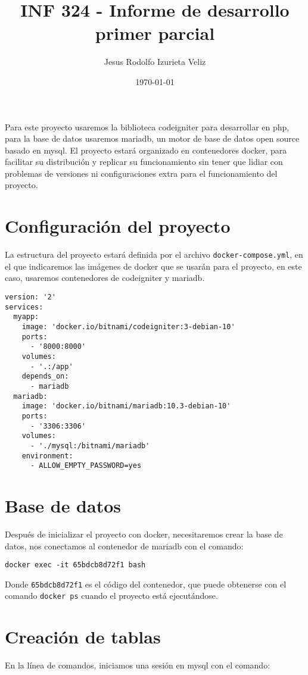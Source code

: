 \documentclass[letter]{article}
\author{Jesus Rodolfo Izurieta Veliz}
\date{\today}
\title{INF 324 - Informe de desarrollo primer parcial}
\begin{document}
\maketitle
Para este proyecto usaremos la biblioteca codeigniter para desarrollar en php,
para la base de datos usaremos mariadb, un motor de base de datos open source
basado en mysql. El proyecto estará organizado en contenedores docker, para
facilitar su distribución y replicar su funcionamiento sin tener que lidiar con
problemas de versiones ni configuraciones extra para el funcionamiento del
proyecto.

\section{Configuración del proyecto}
\label{sec:org9561cc9}
La estructura del proyecto estará definida por el archivo \texttt{docker-compose.yml},
en el que indicaremos las imágenes de docker que se usarán para el proyecto, en
este caso, usaremos contenedores de codeigniter y mariadb.

\begin{verbatim}
version: '2'
services:
  myapp:
    image: 'docker.io/bitnami/codeigniter:3-debian-10'
    ports:
      - '8000:8000'
    volumes:
      - '.:/app'
    depends_on:
      - mariadb
  mariadb:
    image: 'docker.io/bitnami/mariadb:10.3-debian-10'
    ports:
      - '3306:3306'
    volumes:
      - './mysql:/bitnami/mariadb'
    environment:
      - ALLOW_EMPTY_PASSWORD=yes
\end{verbatim}

\section{Base de datos}
\label{sec:org007a13f}
Después de inicializar el proyecto con docker, necesitaremos crear la base de
datos, nos conectamos al contenedor de mariadb con el comando:

\texttt{docker exec -it 65bdcb8d72f1 bash}

Donde \texttt{65bdcb8d72f1} es el código del contenedor, que puede obtenerse con el
comando \texttt{docker ps} cuando el proyecto está ejecutándose.

\section{Creación de tablas}
\label{sec:org01629b3}
En la línea de comandos, iniciamos una sesión en mysql con el comando:
\end{document}
